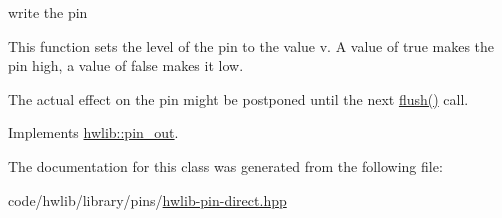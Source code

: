 write the pin

This function sets the level of the pin to the value v. A value of true makes the pin high, a value of false makes it low.

The actual effect on the pin might be postponed until the next \hyperlink{classhwlib_1_1pin__direct__from__out__t_af623d47b7d7b8b0878a9ac359a3668d8}{flush()} call. 

Implements \hyperlink{classhwlib_1_1pin__out_a8d260a70e503dcfb81987c408e170300}{hwlib\+::pin\+\_\+out}.



The documentation for this class was generated from the following file\+:\begin{DoxyCompactItemize}
\item 
code/hwlib/library/pins/\hyperlink{hwlib-pin-direct_8hpp}{hwlib-\/pin-\/direct.\+hpp}\end{DoxyCompactItemize}
